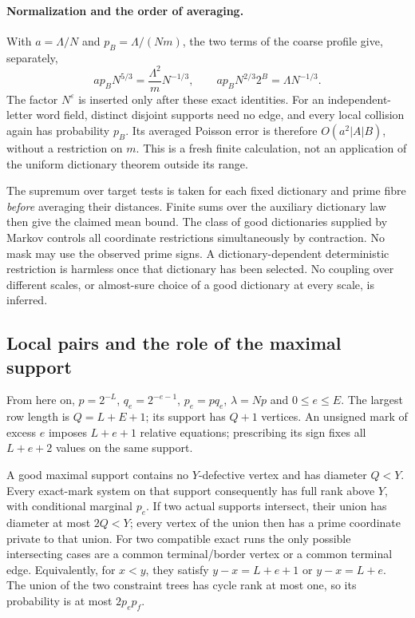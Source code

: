\paragraph{Normalization and the order of averaging.}
With $a=\Lambda/N$ and $p_B=\Lambda/(Nm)$, the two terms of the coarse
profile give, separately,
\[
 ap_BN^{5/3}=\frac{\Lambda^2}{m}N^{-1/3},\qquad
 ap_BN^{2/3}2^B=\Lambda N^{-1/3}.
\]
The factor $N^\varepsilon$ is inserted only after these exact identities.
For an independent-letter word field, distinct disjoint supports need no
edge, and every local collision again has probability $p_B$. Its averaged
Poisson error is therefore $O(a^2|A|B)$, without a restriction on $m$.
This is a fresh finite calculation, not an application of the uniform
dictionary theorem outside its range.

The supremum over target tests is taken for each fixed dictionary and
prime fibre \emph{before} averaging their distances. Finite sums over the
auxiliary dictionary law then give the claimed mean bound. The class of
good dictionaries supplied by Markov controls all coordinate restrictions
simultaneously by contraction. No mask may use the observed prime signs.
A dictionary-dependent deterministic restriction is harmless once that
dictionary has been selected. No coupling over different scales, or
almost-sure choice of a good dictionary at every scale, is inferred.

\subsection{Local pairs and the role of the maximal support}\label{supp:sec:local-marks}
From here on, $p=2^{-L}$, $q_e=2^{-e-1}$, $p_e=pq_e$,
$\lambda=Np$ and $0\le e\le E$. The largest row length is
$Q=L+E+1$; its support has $Q+1$ vertices. An unsigned mark of excess $e$
imposes $L+e+1$ relative equations; prescribing its sign fixes all
$L+e+2$ values on the same support.

A good maximal support contains no $Y$-defective vertex and has diameter
$Q<Y$. Every exact-mark system on that support consequently has full rank
above $Y$, with conditional marginal $p_e$. If two actual supports intersect,
their union has diameter at most $2Q<Y$; every vertex of the union then has a
prime coordinate private to that union. For two compatible exact runs the
only possible intersecting cases are a common terminal/border vertex or a
common terminal edge. Equivalently, for $x<y$, they satisfy
$y-x=L+e+1$ or $y-x=L+e$. The union of the two constraint trees has cycle
rank at most one, so its probability is at most $2p_ep_f$.

